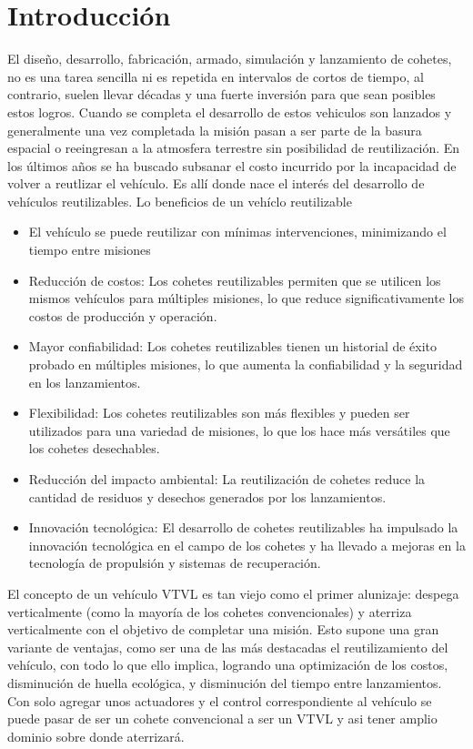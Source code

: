 
\section{Introducción}
El diseño, desarrollo, fabricación, armado, simulación y lanzamiento de cohetes, no es una tarea
sencilla ni es repetida en intervalos de cortos de tiempo, al contrario, suelen llevar décadas y una
fuerte inversión para que sean posibles estos logros. Cuando se completa el desarrollo de estos vehiculos son lanzados y generalmente una vez completada la misión pasan a ser parte de la basura espacial o reeingresan a la atmosfera terrestre sin posibilidad de reutilización. En los últimos años se ha buscado subsanar el costo incurrido por la incapacidad de volver a reutlizar el vehículo. Es allí donde nace el interés del desarrollo de vehículos reutilizables. Lo beneficios de un vehíclo reutilizable

\begin{itemize}
    \item El vehículo se puede reutilizar con mínimas intervenciones, minimizando el tiempo entre misiones
    \item Reducción de costos: Los cohetes reutilizables permiten que se utilicen los mismos vehículos para múltiples misiones, lo que reduce significativamente los costos de producción y operación.
    \item Mayor confiabilidad: Los cohetes reutilizables tienen un historial de éxito probado en múltiples misiones, lo que aumenta la confiabilidad y la seguridad en los lanzamientos.
    \item Flexibilidad: Los cohetes reutilizables son más flexibles y pueden ser utilizados para una variedad de misiones, lo que los hace más versátiles que los cohetes desechables.
    \item Reducción del impacto ambiental: La reutilización de cohetes reduce la cantidad de residuos y desechos generados por los lanzamientos.
    \item Innovación tecnológica: El desarrollo de cohetes reutilizables ha impulsado la innovación tecnológica en el campo de los cohetes y ha llevado a mejoras en la tecnología de propulsión y sistemas de recuperación.
\end{itemize}

\medskip

\medskip

El concepto de un vehículo VTVL es tan viejo como el primer alunizaje: despega verticalmente (como la mayoría de los cohetes
convencionales) y aterriza verticalmente con el objetivo de completar una misión. Esto supone una gran variante de ventajas, como ser una de
las más destacadas el reutilizamiento del vehículo, con todo lo que ello implica, logrando una
optimización de los costos, disminución de huella ecológica, y disminución del tiempo entre lanzamientos. Con solo agregar unos actuadores y el control correspondiente al vehículo se puede pasar de ser un cohete convencional a ser un VTVL y asi tener amplio dominio sobre donde aterrizará.


